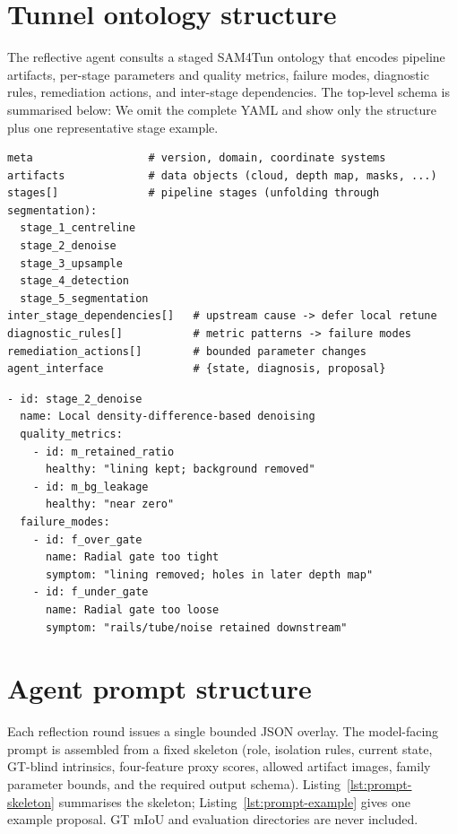 \documentclass[a4paper,fleqn]{cas-dc}
\begin{document}
{\section{Tunnel ontology structure}\label{app:ontology}

The reflective agent consults a staged SAM4Tun ontology that encodes pipeline
artifacts, per-stage parameters and quality metrics, failure modes, diagnostic
rules, remediation actions, and inter-stage dependencies. The top-level schema
is summarised below:
We omit the complete YAML and show only the structure plus one representative
stage example.

\begin{lstlisting}[caption={Ontology top-level keys and stage inventory.},label={lst:ontology-structure}]
meta                  # version, domain, coordinate systems
artifacts             # data objects (cloud, depth map, masks, ...)
stages[]              # pipeline stages (unfolding through segmentation):
  stage_1_centreline
  stage_2_denoise
  stage_3_upsample
  stage_4_detection
  stage_5_segmentation
inter_stage_dependencies[]   # upstream cause -> defer local retune
diagnostic_rules[]           # metric patterns -> failure modes
remediation_actions[]        # bounded parameter changes
agent_interface              # {state, diagnosis, proposal}
\end{lstlisting}

\begin{lstlisting}[caption={Example ontology stage: radial denoising failure modes.},label={lst:ontology-example}]
- id: stage_2_denoise
  name: Local density-difference-based denoising
  quality_metrics:
    - id: m_retained_ratio
      healthy: "lining kept; background removed"
    - id: m_bg_leakage
      healthy: "near zero"
  failure_modes:
    - id: f_over_gate
      name: Radial gate too tight
      symptom: "lining removed; holes in later depth map"
    - id: f_under_gate
      name: Radial gate too loose
      symptom: "rails/tube/noise retained downstream"
\end{lstlisting}

\section{Agent prompt structure}\label{app:prompt}

Each reflection round issues a single bounded JSON overlay. The model-facing
prompt is assembled from a fixed skeleton (role, isolation rules, current
state, GT-blind intrinsics, four-feature proxy scores, allowed artifact images,
family parameter bounds, and the required output schema). Listing~\ref{lst:prompt-skeleton}
summarises the skeleton; Listing~\ref{lst:prompt-example} gives one example
proposal. GT mIoU and evaluation directories are never included.

}
\end{document}
